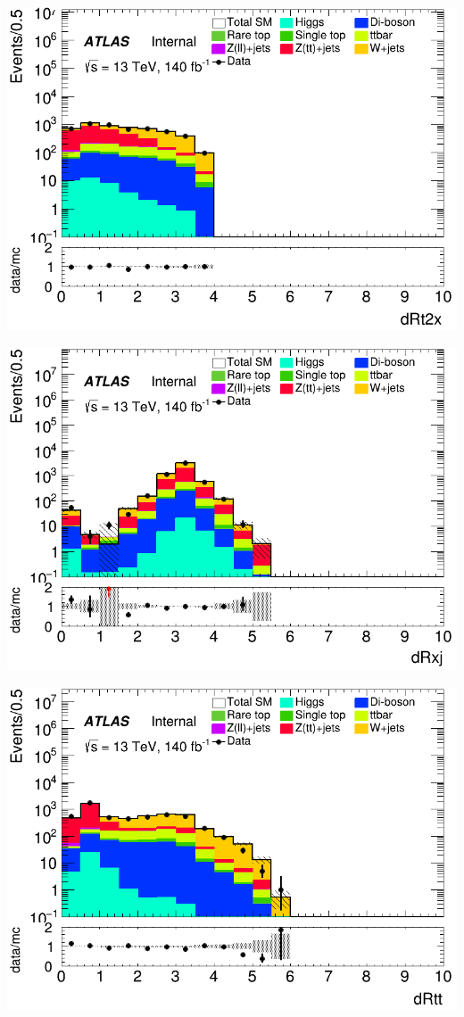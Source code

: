 \documentclass[usenames,dvipsnames]{beamer}
\begin{document}
\begin{frame}
    \begin{minipage}{0.32\textwidth}
        \centering
        \includegraphics[width=\textwidth]{graphics/H_met/H_met_dRt2x.png}
    \end{minipage}
    \hfill
    \begin{minipage}{0.32\textwidth}
        \centering
        \includegraphics[width=\textwidth]{graphics/H_met/H_met_dRxj.png}
    \end{minipage}
    \hfill
    \begin{minipage}{0.32\textwidth}
        \centering
        \includegraphics[width=\textwidth]{graphics/H_met/H_met_dRtt.png}

\end{minipage}
\end{frame}
\end{document}
